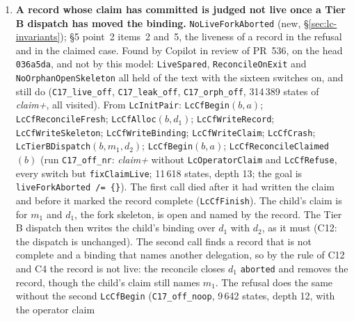 \documentclass[a4paper,10pt,fleqn]{article}
\newcommand{\field}[1]{\texttt{#1}}
\begin{document}
\begin{enumerate}
    sweep's later write finds $d$ not open and, with \field{fixCas}, leaves the
    verdict; without the test (\texttt{MutResumeCas}) the exit overwrites a pass
    verdict the sweep has already written. The same exit on the fresh path, or
    when the identifiers are exhausted, finds the record already removed and
    closes nothing. With the switch on all eight invariants then defined hold on
    \emph{claim-u} and \emph{claim+u}; since C17 the rows
    \texttt{U1\_*\_all}, \texttt{U2\_*\_all} include a ninth,
    \field{NoLiveForkAborted}, and all nine hold.
  \item[\textbf{C17}] \textbf{A record whose claim has committed is judged not
    live once a Tier B dispatch has moved the binding.}
    \field{NoLiveForkAborted} (new, \S\ref{sec:lc-invariants}); \S5 point~2
    items~2 and~5, the liveness of a record in the refusal and in the claimed
    case. Found by Copilot in review of PR~536, on the head \texttt{036a5da},
    and not by this model: \field{LiveSpared}, \field{ReconcileOnExit} and
    \field{NoOrphanOpenSkeleton} all held of the text with the sixteen
    switches on, and still do (\texttt{C17\_live\_off},
    \texttt{C17\_leak\_off}, \texttt{C17\_orph\_off}, 314\,389 states of
    \emph{claim+}, all visited). From \field{LcInitPair}:
    \field{LcCfBegin}$(b,a)$; \field{LcCfReconcileFresh}; \field{LcCfAlloc}$(b,d_1)$;
    \field{LcCfWriteRecord}; \field{LcCfWriteSkeleton}; \field{LcCfWriteBinding};
    \field{LcCfWriteClaim}; \field{LcCfCrash}; \field{LcTierBDispatch}$(b,m_1,d_2)$;
    \field{LcCfBegin}$(b,a)$; \field{LcCfReconcileClaimed}$(b)$ (run
    \texttt{C17\_off\_nr}: \emph{claim+} without \field{LcOperatorClaim} and
    \field{LcCfRefuse}, every switch but \field{fixClaimLive}; 11\,618 states,
    depth 13; the goal is \texttt{liveForkAborted /= \{\}}). The first call
    died after it had written the claim and before it marked the record
    complete (\field{LcCfFinish}). The child's claim is for $m_1$ and
    $d_1$, the fork skeleton, is open and named by the record. The Tier B
    dispatch then writes the child's binding over $d_1$ with $d_2$, as it must
    (C12: the dispatch is unchanged). The second call finds a record that is
    not complete and a binding that names another delegation, so by the rule
    of C12 and C4 the record is not live: the reconcile closes $d_1$ \field{aborted}
    and removes the record, though the child's claim still names $m_1$. The
    refusal does the same without the second \field{LcCfBegin}
    (\texttt{C17\_off\_noop}, 9\,642 states, depth 12, with the operator claim

\end{enumerate}
\end{document}
